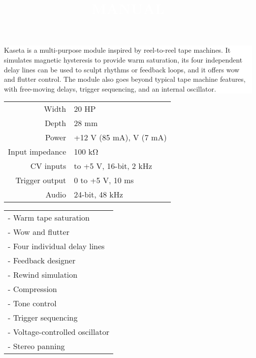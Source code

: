 \documentclass[11pt]{article}
\begin{document}
\pagecolor{black}\afterpage{\nopagecolor}

\title{\textcolor{white}{MANUAL}}
\author{}
\date{}

\begin{minipage}{0.4\textwidth}
\color{white}
\maketitle

\noindent\colorbox{white}
{
\begin{minipage}{0.85\textwidth}\color{black}
Kaseta is a multi-purpose module inspired by reel-to-reel tape machines. It
simulates magnetic hysteresis to provide warm saturation, its four independent
delay lines can be used to sculpt rhythms or feedback loops, and it offers wow
and flutter control. The module also goes beyond typical tape machine features,
with free-moving delays, trigger sequencing, and an internal oscillator.
\end{minipage}
}

\vspace{1cm}

\begin{minipage}{0.8\textwidth}\color{white}
\begin{tabular}{@{}rl@{}}
  Width & 20 HP \\
  Depth & 28 mm \\
  Power & +12 V (85 mA), \textminus12 V (7 mA) \\
  Input impedance & 100 kΩ \\
  CV inputs & \textminus5 to +5 V, 16-bit, 2 kHz \\
  Trigger output & 0 to +5 V, 10 ms \\
  Audio & 24-bit, 48 kHz
\end{tabular}
\end{minipage}

\vspace{1cm}

\begin{minipage}{0.8\textwidth}\color{white}
\begin{tabular}{@{}l}
  - Warm tape saturation \\
  - Wow and flutter \\
  - Four individual delay lines \\
  - Feedback designer \\
  - Rewind simulation \\
  - Compression \\
  - Tone control \\
  - Trigger sequencing \\
  - Voltage-controlled oscillator \\
  - Stereo panning
\end{tabular}
\end{minipage}

\end{minipage}%
\end{document}
